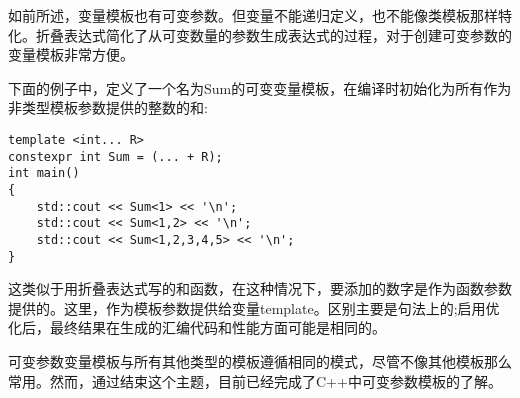 如前所述，变量模板也有可变参数。但变量不能递归定义，也不能像类模板那样特化。折叠表达式简化了从可变数量的参数生成表达式的过程，对于创建可变参数的变量模板非常方便。

下面的例子中，定义了一个名为Sum的可变变量模板，在编译时初始化为所有作为非类型模板参数提供的整数的和:

\begin{lstlisting}[style=styleCXX]
template <int... R>
constexpr int Sum = (... + R);
int main()
{
	std::cout << Sum<1> << '\n';
	std::cout << Sum<1,2> << '\n';
	std::cout << Sum<1,2,3,4,5> << '\n';
}
\end{lstlisting}

这类似于用折叠表达式写的和函数，在这种情况下，要添加的数字是作为函数参数提供的。这里，作为模板参数提供给变量template。区别主要是句法上的;启用优化后，最终结果在生成的汇编代码和性能方面可能是相同的。

可变参数变量模板与所有其他类型的模板遵循相同的模式，尽管不像其他模板那么常用。然而，通过结束这个主题，目前已经完成了C++中可变参数模板的了解。















































